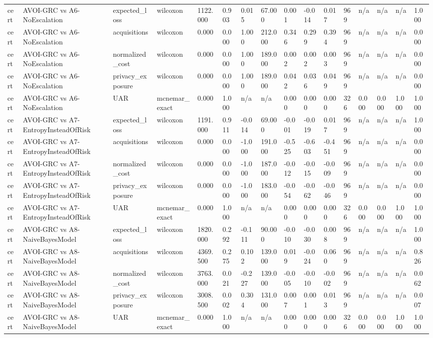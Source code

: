 \begin{table}[!ht]
{\begin{tabular}{llllllllllllllll}
cert & AVOI-GRC vs A6-NoEscalation & expected\_loss & wilcoxon & 1122.000 & 0.903 & 0.015 & 67.000 & 0.001 & -0.014 & 0.017 & 969 & n/a & n/a & n/a & 1.000 \\
cert & AVOI-GRC vs A6-NoEscalation & acquisitions & wilcoxon & 0.000 & 0.000 & 1.000 & 212.000 & 0.346 & 0.299 & 0.394 & 969 & n/a & n/a & n/a & 0.000 \\
cert & AVOI-GRC vs A6-NoEscalation & normalized\_cost & wilcoxon & 0.000 & 0.000 & 1.000 & 189.000 & 0.002 & 0.002 & 0.003 & 969 & n/a & n/a & n/a & 0.000 \\
cert & AVOI-GRC vs A6-NoEscalation & privacy\_exposure & wilcoxon & 0.000 & 0.000 & 1.000 & 189.000 & 0.042 & 0.036 & 0.049 & 969 & n/a & n/a & n/a & 0.000 \\
cert & AVOI-GRC vs A6-NoEscalation & UAR & mcnemar\_exact & 0.000 & 1.000 & n/a & n/a & 0.000 & 0.000 & 0.000 & 326 & 0.000 & 0.000 & 1.000 & 1.000 \\
cert & AVOI-GRC vs A7-EntropyInsteadOfRisk & expected\_loss & wilcoxon & 1191.000 & 0.911 & -0.014 & 69.000 & -0.001 & -0.019 & 0.017 & 969 & n/a & n/a & n/a & 1.000 \\
cert & AVOI-GRC vs A7-EntropyInsteadOfRisk & acquisitions & wilcoxon & 0.000 & 0.000 & -1.000 & 191.000 & -0.525 & -0.603 & -0.451 & 969 & n/a & n/a & n/a & 0.000 \\
cert & AVOI-GRC vs A7-EntropyInsteadOfRisk & normalized\_cost & wilcoxon & 0.000 & 0.000 & -1.000 & 187.000 & -0.012 & -0.015 & -0.009 & 969 & n/a & n/a & n/a & 0.000 \\
cert & AVOI-GRC vs A7-EntropyInsteadOfRisk & privacy\_exposure & wilcoxon & 0.000 & 0.000 & -1.000 & 183.000 & -0.054 & -0.062 & -0.046 & 969 & n/a & n/a & n/a & 0.000 \\
cert & AVOI-GRC vs A7-EntropyInsteadOfRisk & UAR & mcnemar\_exact & 0.000 & 1.000 & n/a & n/a & 0.000 & 0.000 & 0.000 & 326 & 0.000 & 0.000 & 1.000 & 1.000 \\
cert & AVOI-GRC vs A8-NaiveBayesModel & expected\_loss & wilcoxon & 1820.000 & 0.292 & -0.111 & 90.000 & -0.010 & -0.030 & 0.008 & 969 & n/a & n/a & n/a & 1.000 \\
cert & AVOI-GRC vs A8-NaiveBayesModel & acquisitions & wilcoxon & 4369.500 & 0.275 & 0.102 & 139.000 & 0.019 & -0.024 & 0.060 & 969 & n/a & n/a & n/a & 0.826 \\
cert & AVOI-GRC vs A8-NaiveBayesModel & normalized\_cost & wilcoxon & 3763.000 & 0.021 & -0.227 & 139.000 & -0.005 & -0.010 & -0.002 & 969 & n/a & n/a & n/a & 0.062 \\
cert & AVOI-GRC vs A8-NaiveBayesModel & privacy\_exposure & wilcoxon & 3008.500 & 0.002 & 0.304 & 131.000 & 0.007 & 0.001 & 0.013 & 969 & n/a & n/a & n/a & 0.007 \\
cert & AVOI-GRC vs A8-NaiveBayesModel & UAR & mcnemar\_exact & 0.000 & 1.000 & n/a & n/a & 0.000 & 0.000 & 0.000 & 326 & 0.000 & 0.000 & 1.000 & 1.000 \\
\bottomrule
\end{tabular}}
\end{table}
